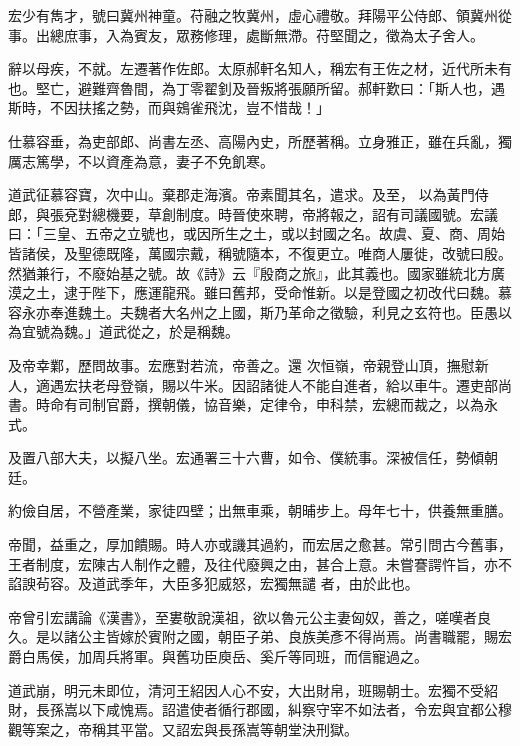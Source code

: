 \begin{pinyinscope}
 宏少有雋才，號曰冀州神童。苻融之牧冀州，虛心禮敬。拜陽平公侍郎、領冀州從事。出總庶事，入為賓友，眾務修理，處斷無滯。苻堅聞之，徵為太子舍人。



 辭以母疾，不就。左遷著作佐郎。太原郝軒名知人，稱宏有王佐之材，近代所未有也。堅亡，避難齊魯間，為丁零翟釗及晉叛將張願所留。郝軒歎曰：「斯人也，遇斯時，不因扶搖之勢，而與鴳雀飛沈，豈不惜哉！」



 仕慕容垂，為吏部郎、尚書左丞、高陽內史，所歷著稱。立身雅正，雖在兵亂，獨厲志篤學，不以資產為意，妻子不免飢寒。



 道武征慕容寶，次中山。棄郡走海濱。帝素聞其名，遣求。及至，
 以為黃門侍郎，與張兗對總機要，草創制度。時晉使來聘，帝將報之，詔有司議國號。宏議曰：「三皇、五帝之立號也，或因所生之土，或以封國之名。故虞、夏、商、周始皆諸侯，及聖德既隆，萬國宗戴，稱號隨本，不復更立。唯商人屢徙，改號曰殷。然猶兼行，不廢始基之號。故《詩》云『殷商之旅』，此其義也。國家雖統北方廣漠之土，逮于陛下，應運龍飛。雖曰舊邦，受命惟新。以是登國之初改代曰魏。慕容永亦奉進魏土。夫魏者大名州之上國，斯乃革命之徵驗，利見之玄符也。臣愚以為宜號為魏。」道武從之，於是稱魏。



 及帝幸鄴，歷問故事。宏應對若流，帝善之。還
 次恒嶺，帝親登山頂，撫慰新人，適遇宏扶老母登嶺，賜以牛米。因詔諸徙人不能自進者，給以車牛。遷吏部尚書。時命有司制官爵，撰朝儀，協音樂，定律令，申科禁，宏總而裁之，以為永式。



 及置八部大夫，以擬八坐。宏通署三十六曹，如令、僕統事。深被信任，勢傾朝廷。



 約儉自居，不營產業，家徒四壁；出無車乘，朝晡步上。母年七十，供養無重膳。



 帝聞，益重之，厚加饋賜。時人亦或譏其過約，而宏居之愈甚。常引問古今舊事，王者制度，宏陳古人制作之體，及往代廢興之由，甚合上意。未嘗謇諤忤旨，亦不諂諛茍容。及道武季年，大臣多犯威怒，宏獨無譴
 者，由於此也。



 帝曾引宏講論《漢書》，至婁敬說漢祖，欲以魯元公主妻匈奴，善之，嗟嘆者良久。是以諸公主皆嫁於賓附之國，朝臣子弟、良族美彥不得尚焉。尚書職罷，賜宏爵白馬侯，加周兵將軍。與舊功臣庾岳、奚斤等同班，而信寵過之。



 道武崩，明元未即位，清河王紹因人心不安，大出財帛，班賜朝士。宏獨不受紹財，長孫嵩以下咸愧焉。詔遣使者循行郡國，糾察守宰不如法者，令宏與宜都公穆觀等案之，帝稱其平當。又詔宏與長孫嵩等朝堂決刑獄。




\end{pinyinscope}

